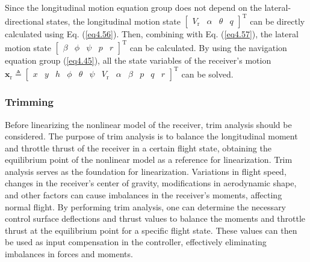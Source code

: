 Since the longitudinal motion equation group does not depend on the lateral-directional states, the longitudinal motion state ${\left[ {\begin{array}{*{20}{c}}
		{{V_\mathrm{r}}}&\alpha &\theta &q
		\end{array}} \right]^\mathrm{T}}$ can be directly calculated using Eq. (\ref{eq4.56}). Then, combining with Eq. (\ref{eq4.57}), the lateral motion state ${\left[ {\begin{array}{*{20}{c}}
		\beta &\phi &\psi &p&r
		\end{array}} \right]^\mathrm{T}}$ can be calculated. By using the navigation equation group (\ref{eq4.45}), all the state variables of the receiver's motion ${\mathbf{x}_\mathrm{r}} \triangleq {\left[ {\begin{array}{*{20}{c}}
		x&y&h&\phi &\theta &\psi &{{V_\mathrm{r}}}&\alpha &\beta &p&q&r
		\end{array}} \right]^\mathrm{T}}$ can be solved.

\subsubsection{Trimming}
Before linearizing the nonlinear model of the receiver, trim analysis should be considered. The purpose of trim analysis is to balance the longitudinal moment and throttle thrust of the receiver in a certain flight state, obtaining the equilibrium point of the nonlinear model as a reference for linearization. Trim analysis serves as the foundation for linearization. Variations in flight speed, changes in the receiver's center of gravity, modifications in aerodynamic shape, and other factors can cause imbalances in the receiver's moments, affecting normal flight. By performing trim analysis, one can determine the necessary control surface deflections and thrust values to balance the moments and throttle thrust at the equilibrium point for a specific flight state. These values can then be used as input compensation in the controller, effectively eliminating imbalances in forces and moments.

